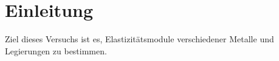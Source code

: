 
\section{Einleitung}
Ziel dieses Versuchs ist es, Elastizitätsmodule verschiedener Metalle
und Legierungen zu bestimmen.
